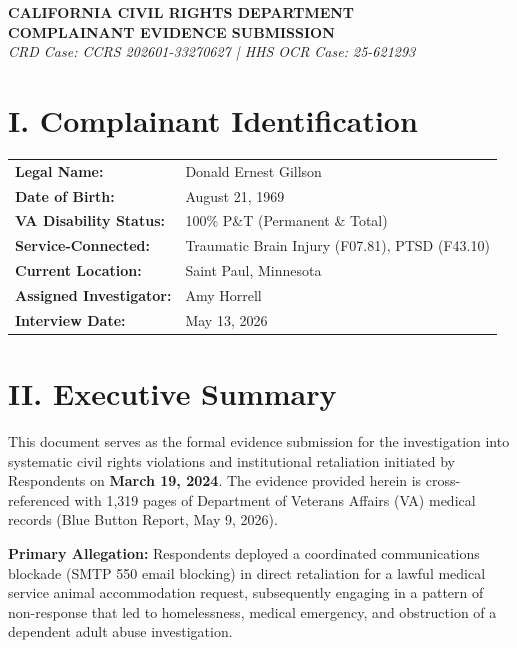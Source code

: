 \documentclass[11pt, a4paper]{article}
\begin{document}
\begin{tcolorbox}[colback=crdblue!5, colframe=crdblue, arc=0mm, boxrule=0.5mm]
    \centering
    \Large \textbf{CALIFORNIA CIVIL RIGHTS DEPARTMENT} \\
    \vspace{0.2cm}
    \large \textbf{COMPLAINANT EVIDENCE SUBMISSION} \\
    \small \textit{CRD Case: CCRS 202601-33270627 | HHS OCR Case: 25-621293}
\end{tcolorbox}

\vspace{0.5cm}

\section{I. Complainant Identification}
\begin{tabular}{ll}
    \textbf{Legal Name:} & Donald Ernest Gillson \\
    \textbf{Date of Birth:} & August 21, 1969 \\
    \textbf{VA Disability Status:} & 100\% P\&T (Permanent \& Total) \\
    \textbf{Service-Connected:} & Traumatic Brain Injury (F07.81), PTSD (F43.10) \\
    \textbf{Current Location:} & Saint Paul, Minnesota \\
    \textbf{Assigned Investigator:} & Amy Horrell \\
    \textbf{Interview Date:} & May 13, 2026
\end{tabular}

\vspace{0.5cm}

\section{II. Executive Summary}

This document serves as the formal evidence submission for the investigation into systematic civil rights violations and institutional retaliation initiated by Respondents on \textbf{March 19, 2024}. The evidence provided herein is cross-referenced with 1,319 pages of Department of Veterans Affairs (VA) medical records (Blue Button Report, May 9, 2026).

\textbf{Primary Allegation:} Respondents deployed a coordinated communications blockade (SMTP 550 email blocking) in direct retaliation for a lawful medical service animal accommodation request, subsequently engaging in a pattern of non-response that led to homelessness, medical emergency, and obstruction of a dependent adult abuse investigation.
\end{document}
